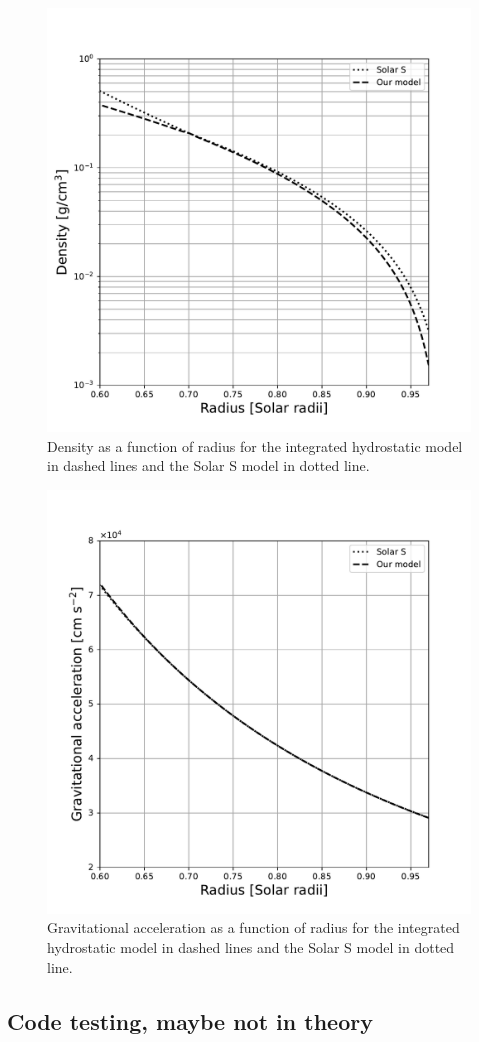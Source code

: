 \begin{figure}[htbp]
    \centering
    \includegraphics[width=0.8\linewidth]{./solar_vs_model_plots/Density.pdf} %
    \caption{Density as a function of radius for the integrated hydrostatic model in dashed lines and the Solar S model in dotted line.}
    \label{fig:density} %
\end{figure}

\begin{figure}[htbp]
    \centering
    \includegraphics[width=0.8\linewidth]{./solar_vs_model_plots/Gravitational_acceleration.pdf} %
    \caption{Gravitational acceleration as a function of radius for the integrated hydrostatic model in dashed lines and the Solar S model in dotted line.}
    \label{fig:gravitationa_acceleration} %
\end{figure}

\subsection{Code testing, maybe not in theory}